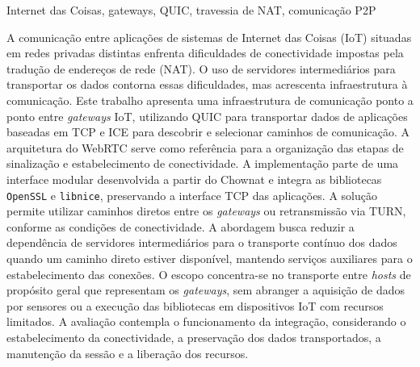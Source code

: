 \documentclass[portuguese, oneside]{pucrs-ppgcc}
\begin{document}
\begin{resumo}{Internet das Coisas, gateways, QUIC, travessia de NAT, comunicação P2P}

A comunicação entre aplicações de sistemas de Internet das Coisas (IoT) situadas em redes privadas distintas enfrenta dificuldades de conectividade impostas pela tradução de endereços de rede (NAT). O uso de servidores intermediários para transportar os dados contorna essas dificuldades, mas acrescenta infraestrutura à comunicação. Este trabalho apresenta uma infraestrutura de comunicação ponto a ponto entre \textit{gateways} IoT, utilizando QUIC para transportar dados de aplicações baseadas em TCP e ICE para descobrir e selecionar caminhos de comunicação. A arquitetura do WebRTC serve como referência para a organização das etapas de sinalização e estabelecimento de conectividade. A implementação parte de uma interface modular desenvolvida a partir do Chownat e integra as bibliotecas \texttt{OpenSSL} e \texttt{libnice}, preservando a interface TCP das aplicações. A solução permite utilizar caminhos diretos entre os \textit{gateways} ou retransmissão via TURN, conforme as condições de conectividade. A abordagem busca reduzir a dependência de servidores intermediários para o transporte contínuo dos dados quando um caminho direto estiver disponível, mantendo serviços auxiliares para o estabelecimento das conexões. O escopo concentra-se no transporte entre \textit{hosts} de propósito geral que representam os \textit{gateways}, sem abranger a aquisição de dados por sensores ou a execução das bibliotecas em dispositivos IoT com recursos limitados. A avaliação contempla o funcionamento da integração, considerando o estabelecimento da conectividade, a preservação dos dados transportados, a manutenção da sessão e a liberação dos recursos.


\end{resumo}
\end{document}
